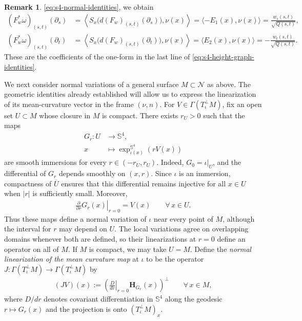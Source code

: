 \documentclass[a4paper,11pt,oneside,reqno]{amsart}
\numberwithin{equation}{section}
\theoremstyle{definition}
\newtheorem{remark}[theorem]{Remark}
\begin{document}
\begin{remark}
    \eqref{eq:s4-normal-identities}, we obtain
    \begin{align*}
        (F_w^*\omega)_{(s,t)}(\partial_s)
        &=\left\langle
        S_x\bigl(d(F_w)_{(s,t)}(\partial_s)\bigr),\nu(x)
        \right\rangle=\langle-E_1(x),\nu(x)\rangle
        =\frac{w_s(s,t)}{\sqrt{Q(s,t)}},\\
        (F_w^*\omega)_{(s,t)}(\partial_t)
        &=\left\langle
        S_x\bigl(d(F_w)_{(s,t)}(\partial_t)\bigr),\nu(x)
        \right\rangle=\langle E_2(x),\nu(x)\rangle
        =-\frac{w_t(s,t)}{\sqrt{Q(s,t)}}.
    \end{align*}
    These are the coefficients of the one-form in the last
    line of \eqref{eq:s4-height-graph-identities}.
\end{remark}
%
We next consider normal variations of a general surface
$M\subset\mathcal{N}$ as above. The geometric identities
already established will allow us to express the
linearization of its mean-curvature vector in the frame
$(\nu,n)$.
For $V\in\Gamma(T^\perp_\iota M)$, fix an open set
$U\subset M$ whose closure in $M$ is compact.
There exists $r_U>0$ such that the maps
%
\begin{align*}
    G_r:U&\rightarrow\mathbb{S}^4,\\
    x&\mapsto\exp_{\iota(x)}^{\mathbb{S}^4}(rV(x))
\end{align*}
%
are smooth immersions for every $r\in(-r_U,r_U)$. Indeed, $G_0=\iota|_U$,
and the differential of $G_r$ depends smoothly on
$(x,r)$. Since $\iota$ is an immersion, compactness
of $\overline U$ ensures that this differential
remains injective for all $x\in U$ when $|r|$
is sufficiently small. Moreover,
%
\begin{align*}
    \left.\frac{\partial}{\partial r}G_r(x)\right|_{r=0}
    =V(x)
    \qquad\forall\,x\in U.
\end{align*}
%
Thus these maps define a normal variation of $\iota$
near every point of $M$, although the interval for $r$
may depend on $U$. The local variations agree on
overlapping domains whenever both are defined, so
their linearizations at $r=0$ define an operator
on all of $M$. If $M$ is compact, we may take $U=M$.
Define the \textit{normal linearization of the mean curvature map} at $\iota$ to be the operator
$J:\Gamma(T^\perp_\iota M)\to\Gamma(T^\perp_\iota M)$ by
%
\begin{align*}
    (JV)(x):=\left(
    \left.\frac{D}{dr}\right|_{r=0}\mathbf{H}_{G_r}(x)
    \right)^\perp
    \qquad\forall\,x\in M,
\end{align*}
%
where $D/dr$ denotes covariant differentiation in
$\mathbb{S}^4$ along the geodesic $r\mapsto G_r(x)$ and the projection
is onto $(T^\perp_\iota M)_x$.
\end{document}

